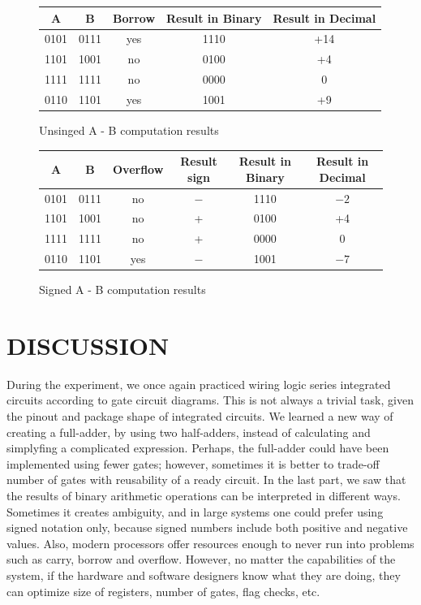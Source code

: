 \documentclass{article}
\begin{document}
\begin{figure}[H]
\centering
\begin{tabular}{|c|c|c|c|c|}
\hline
A & B & Borrow & Result in Binary & Result in Decimal \\
\hline
0101 & 0111 & yes & 1110 & +14 \\
1101 & 1001 & no & 0100 & +4 \\
1111 & 1111 & no & 0000 & 0 \\
0110 & 1101 & yes & 1001 & +9 \\
\hline
\end{tabular}
\caption{Unsinged A - B computation results}
\end{figure}

\begin{figure}[H]
\centering
\begin{tabular}{|c|c|c|c|c|c|}
\hline
A & B & Overflow & Result sign & Result in Binary & Result in Decimal \\
\hline
0101 & 0111 & no & $-$ & 1110 & $-2$ \\
1101 & 1001 & no & + & 0100 & +4 \\
1111 & 1111 & no & + & 0000 & 0 \\
0110 & 1101 & yes & $-$ & 1001 & $-7$ \\
\hline
\end{tabular}
\caption{Signed A - B computation results}
\end{figure}

\section{DISCUSSION}
During the experiment, we once again practiced wiring logic series integrated circuits according to gate circuit diagrams. This is not always a trivial task, given the pinout and package shape of integrated circuits. We learned a new way of creating a full-adder, by using two half-adders, instead of calculating and simplyfing a complicated expression. Perhaps, the full-adder could have been implemented using fewer gates; however, sometimes it is better to trade-off number of gates with reusability of a ready circuit. In the last part, we saw that the results of binary arithmetic operations can be interpreted in different ways. Sometimes it creates ambiguity, and in large systems one could prefer using signed notation only, because signed numbers include both positive and negative values. Also, modern processors offer resources enough to never run into problems such as carry, borrow and overflow. However, no matter the capabilities of the system, if the hardware and software designers know what they are doing, they can optimize size of registers, number of gates, flag checks, etc.
\end{document}
